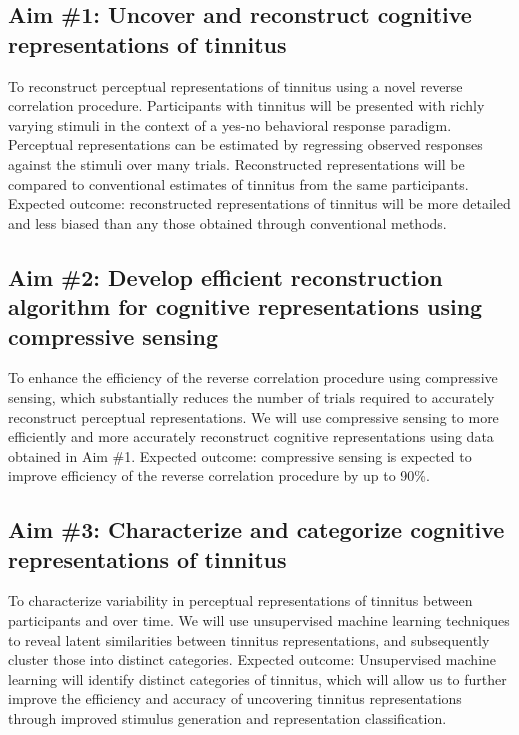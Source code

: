 \documentclass[11pt, notitlepage]{article} %
\begin{document}
\subsection*{Aim \#1: Uncover and reconstruct cognitive representations of tinnitus}

To reconstruct perceptual representations of tinnitus using a novel reverse correlation procedure. Participants with tinnitus will be presented with richly varying stimuli in the context of a yes-no behavioral response paradigm. Perceptual representations can be estimated by regressing observed responses against the stimuli over many trials. Reconstructed representations will be compared to conventional estimates of tinnitus from the same participants. 
Expected outcome: reconstructed representations of tinnitus will be more detailed and less biased than any those obtained through conventional methods.
\subsection*{Aim \#2: Develop efficient reconstruction algorithm for cognitive representations using compressive sensing}

To enhance the efficiency of the reverse correlation procedure using compressive sensing, which substantially reduces the number of trials required to accurately reconstruct perceptual representations. We will use compressive sensing to more efficiently and more accurately reconstruct cognitive representations using data obtained in Aim \#1. Expected outcome: compressive sensing is expected to improve efficiency of the reverse correlation procedure by up to 90\%.

\subsection*{Aim \#3: Characterize and categorize cognitive representations of tinnitus}

To characterize variability in perceptual representations of tinnitus between participants and over time. We will use unsupervised machine learning techniques to reveal latent similarities between tinnitus representations, and subsequently cluster those into distinct categories. Expected outcome: Unsupervised machine learning will identify distinct categories of tinnitus, which will allow us to further improve the efficiency and accuracy of uncovering tinnitus representations through improved stimulus generation and representation classification. \\
\end{document}
